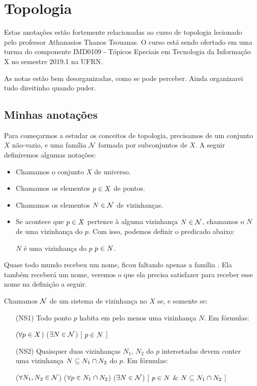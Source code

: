 \chapter{Topologia}
Estas anotações estão fortemente relacionadas ao curso de topologia lecionado pelo professor Athanasios Thanos Tsouanas. O curso está sendo ofertado em uma turma do componente IMD0109 - Tópicos Epeciais em Tecnologia da Informação X no semestre 2019.1 na UFRN.

As notas estão bem desorganizadas, como se pode perceber. Ainda organizarei tudo direitinho quando puder.

\section{Minhas anotações}
Para começarmos a estudar os conceitos de topologia, precisamos de um conjunto $X$ não-vazio, e uma família $\mathcal{N}$ formada por subconjuntos de $X$. A seguir definiremos algumas notações:
\begin{itemize}
	\item Chamamos o conjunto $X$ de universo.
	\item Chamamos os elementos $p \in X$ de pontos.
	\item Chamamos os elementos $N \in \mathcal{N}$ de vizinhanças.
	\item Se acontece que $p \in X$ pertence à alguma vizinhança $N \in \mathcal{N}$, chamamos o $N$ de uma vizinhança do $p$. Com isso, podemos definir o predicado abaixo:
	\begin{center}
		$N$ é uma vizinhança do $p$ \sse $p \in N$.
	\end{center}
\end{itemize}

Quase todo mundo recebeu um nome, ficou faltando apenas a família . Ela também receberá um nome, veremos o que ela precisa satisfazer para receber esse nome na definição a seguir.

\begin{definition}
\label{def:sistema-de-vizinhanca}
Chamamos $\mathcal{N}$ de um sistema de vizinhança no $X$ se, e somente se:
\begin{itemize}
\item[(NS1)]
\label{def:sistema-de-vizinhanca1}
	Todo ponto $p$ habita em pelo menos uma vizinhança $N$. Em fórmulas:
	\begin{center}
		($\forall p \in X$)%
		($\exists N \in \mathcal{N}$)%
		[ $p \in N$ ]
	\end{center}

\item[(NS2)]
\label{def:sistema-de-vizinhanca2}
	Quaisquer duas vizinhanças $N_1$, $N_2$ do $p$ intersetadas devem conter uma vizinhança $N \subseteq N_1 \cap N_2$ do $p$. Em fórmulas:
	\begin{center}
		($\forall N_1, N_2 \in \mathcal{N}$)%
		($\forall p \in N_1 \cap N_2$)%
		($\exists N \in \mathcal{N}$)%
		[ $p \in N$ \& $N \subseteq N_1 \cap N_2$ ]
	\end{center}
\end{itemize}
\end{definition}

